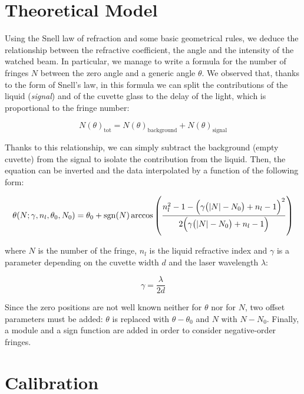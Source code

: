 \documentclass[a4paper, 12pt]{article}
\begin{document}
\section{Theoretical Model}

Using the Snell law of refraction and some basic geometrical rules, we deduce the relationship between the refractive coefficient, the angle and the intensity of the watched beam. In particular, we manage to write a formula for the number of fringes \(N\) between the zero angle and a generic angle \(\theta\). We observed that, thanks to the form of Snell’s law, in this formula we can split the contributions of the liquid (\emph{signal}) and of the cuvette glass to the delay of the light, which is proportional to the fringe number:

\begin{equation}
  N(\theta)_{\text{tot}}  =
  N(\theta)_{\text{background}}  +
  N(\theta)_{\text{signal}}
\end{equation}

Thanks to this relationship, we can simply subtract the background (empty cuvette) from the signal to isolate the contribution from the liquid. Then, the equation can be inverted and the data interpolated by a function of the following form:

\begin{equation}
\theta (N; \gamma, n_l, \theta_0, N_0 )
=\theta_0  +
\operatorname{sgn}(N) \operatorname{arccos}\qty(\frac{
n_l^2-1-\qty(\gamma \qty(\abs{N}-N_0) + n_l - 1)^2
}{
2 \qty(\gamma \qty(\abs{N}-N_0)+n_l -1)
})
\end{equation}

where \(N\) is the number of the fringe, \(n_l\) is the liquid refractive index and \(\gamma\) is
a parameter depending on the cuvette width \(d\) and the laser wavelength \(\lambda\):

\begin{equation}
  \gamma = \frac{\lambda}{2d}
\end{equation}

Since the zero positions are not well known neither for \(\theta\) nor for \(N\), two offset parameters must be added: \(\theta\) is replaced with \(\theta - \theta_0\) and \(N\) with \(N-N_0\). Finally, a module and a sign function are added in order to consider negative-order fringes.

\section{Calibration}
\end{document}
